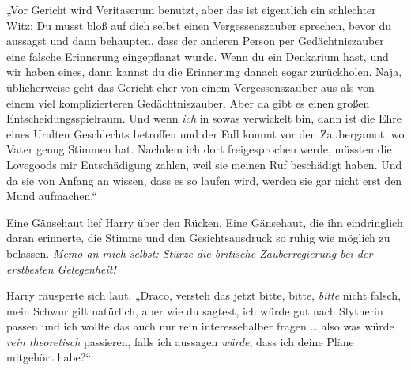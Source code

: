 „Vor Gericht wird Veritaserum benutzt, aber das ist eigentlich ein schlechter Witz: Du musst bloß auf dich selbst einen Vergessenszauber sprechen, bevor du aussagst und dann behaupten, dass der anderen Person per Gedächtniszauber eine falsche Erinnerung eingepflanzt wurde. Wenn du ein Denkarium hast, und wir haben eines, dann kannst du die Erinnerung danach sogar zurückholen. Naja, üblicherweise geht das Gericht eher von einem Vergessenszauber aus als von einem viel komplizierteren Gedächtniszauber. Aber da gibt es einen großen Entscheidungsspielraum. Und wenn \emph{ich} in sowas verwickelt bin, dann ist die Ehre eines Uralten Geschlechts betroffen und der Fall kommt vor den Zaubergamot, wo Vater genug Stimmen hat. Nachdem ich dort freigesprochen werde, müssten die Lovegoods mir Entschädigung zahlen, weil sie meinen Ruf beschädigt haben. Und da sie von Anfang an wissen, dass es so laufen wird, werden sie gar nicht erst den Mund aufmachen.“

Eine Gänsehaut lief Harry über den Rücken. Eine Gänsehaut, die ihn eindringlich daran erinnerte, die Stimme und den Gesichtsausdruck so ruhig wie möglich zu belassen. \emph{Memo an mich selbst: Stürze die britische Zauberregierung bei der erstbesten Gelegenheit!}

Harry räusperte sich laut.
„Draco, versteh das jetzt bitte, bitte, \emph{bitte} nicht falsch, mein Schwur gilt natürlich, aber wie du sagtest, ich würde gut nach Slytherin passen und ich wollte das auch nur rein interessehalber fragen … also was würde \emph{rein theoretisch} passieren, falls ich aussagen \emph{würde}, dass ich deine Pläne mitgehört habe?“

